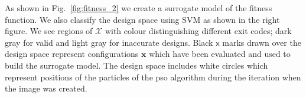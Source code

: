 \documentclass[runningheads,a4paper]{llncs}
\begin{document}
As shown in Fig.~\ref{fig:fitness_2} we create a surrogate model of the fitness function. We also classify the design space using SVM as shown in the right figure. We see regions of $\mathcal{X}$ with colour distinguishing different exit codes; dark gray for valid and light gray for inaccurate designs. Black $\mathsf{x}$ marks drawn over the design space represent configurations $\mathbf{x}$ which have been evaluated and used to build the surrogate model. The design space includes white circles which represent positions of the particles of the \ac{pso} algorithm during the iteration when the image was created.





\end{document}
